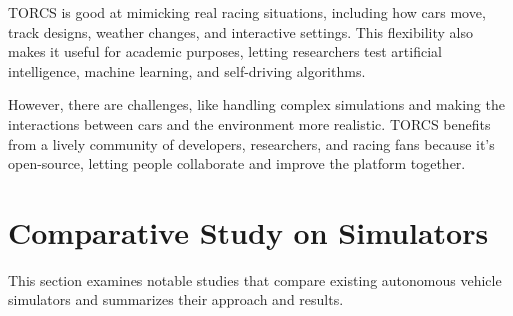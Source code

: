 \documentclass[12pt,twoside,a4paper,parskip]{scrbook} %
\begin{document}
TORCS is good at mimicking real racing situations, including how cars move, track designs, weather changes, and interactive settings. This flexibility also makes it useful for academic purposes, letting researchers test artificial intelligence, machine learning, and self-driving algorithms. 

However, there are challenges, like handling complex simulations and making the interactions between cars and the environment more realistic. TORCS benefits from a lively community of developers, researchers, and racing fans because it's open-source, letting people collaborate and improve the platform together.

\section{Comparative Study on Simulators}
This section examines notable studies that compare existing autonomous vehicle simulators and summarizes their approach and results.
\end{document}
